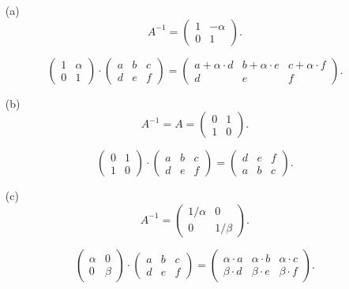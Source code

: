 \begin{itemize}
	\item[(a)] 
		$$
			A^{-1}
			=
			\begin{pmatrix}
				1 & -\alpha\\
				0 & 1
			\end{pmatrix}.
		$$

		$$
			\begin{pmatrix}
				1 & \alpha\\
				0 & 1
			\end{pmatrix}
			\cdot
			\begin{pmatrix}
				a & b & c\\
				d & e  & f
			\end{pmatrix}
			=
			\begin{pmatrix}
				a +\alpha\cdot d	& b + \alpha\cdot e	& c + \alpha\cdot f\\
				d 				& e  				& f
			\end{pmatrix}.			
		$$
	\item[(b)] 
		$$
			A^{-1}
			=
			A
			=
			\begin{pmatrix}
				0 & 1\\
				1 & 0
			\end{pmatrix}.
		$$
		
		$$
			\begin{pmatrix}
				0 & 1\\
				1 & 0
			\end{pmatrix}
			\cdot
			\begin{pmatrix}
				a & b & c\\
				d & e  & f
			\end{pmatrix}
			=
			\begin{pmatrix}
				d & e & f\\
				a & b  & c
			\end{pmatrix}.		
		$$
	\item[(c)] 
		$$
			A^{-1}
			=
			\begin{pmatrix}
				1/\alpha 	& 0\\
				0 		& 1/\beta
			\end{pmatrix}.
		$$
		
		$$
			\begin{pmatrix}
				\alpha 	& 0\\
				0 		& \beta
			\end{pmatrix}
			\cdot
			\begin{pmatrix}
				a & b & c\\
				d & e  & f
			\end{pmatrix}
			=
			\begin{pmatrix}
				\alpha \cdot a 	& \alpha \cdot b & \alpha \cdot c\\
				\beta \cdot d	& \beta \cdot e	 & \beta \cdot f
			\end{pmatrix}.		
		$$
\end{itemize}

